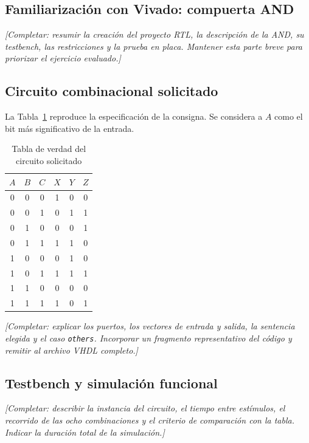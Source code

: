 \documentclass[conference]{IEEEtran}
\newcommand{\pendiente}[1]{\textit{[Completar: #1.]}}
\begin{document}
\subsection{Familiarización con Vivado: compuerta AND}
\pendiente{resumir la creación del proyecto RTL, la descripción de la
AND, su testbench, las restricciones y la prueba en placa. Mantener
esta parte breve para priorizar el ejercicio evaluado}

\subsection{Circuito combinacional solicitado}
La Tabla~\ref{tab:verdad} reproduce la especificación de la consigna.
Se considera a $A$ como el bit más significativo de la entrada.
\begin{table}[htbp]
\centering
\caption{Tabla de verdad del circuito solicitado}
\label{tab:verdad}
\begin{tabular}{ccc|ccc}
\toprule
$A$ & $B$ & $C$ & $X$ & $Y$ & $Z$\\
\midrule
0 & 0 & 0 & 1 & 0 & 0\\
0 & 0 & 1 & 0 & 1 & 1\\
0 & 1 & 0 & 0 & 0 & 1\\
0 & 1 & 1 & 1 & 1 & 0\\
1 & 0 & 0 & 0 & 1 & 0\\
1 & 0 & 1 & 1 & 1 & 1\\
1 & 1 & 0 & 0 & 0 & 0\\
1 & 1 & 1 & 1 & 0 & 1\\
\bottomrule
\end{tabular}
\end{table}
\pendiente{explicar los puertos, los vectores de entrada y salida, la
sentencia elegida y el caso \texttt{others}. Incorporar un fragmento
representativo del código y remitir al archivo VHDL completo}

\subsection{Testbench y simulación funcional}
\pendiente{describir la instancia del circuito, el tiempo entre
estímulos, el recorrido de las ocho combinaciones y el criterio de
comparación con la tabla. Indicar la duración total de la simulación}
\end{document}
